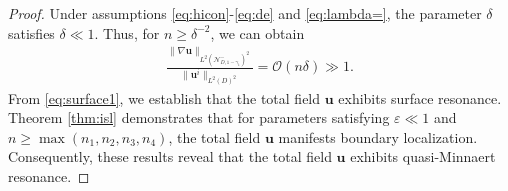 \documentclass[11pt,reqno,twoside]{amsart}
\theoremstyle{definition}
\theoremstyle{remark}
\numberwithin{equation}{section}
\newcommand{\bu}{\mathbf{u}}
\begin{document}
\begin{proof}
			Under assumptions \eqref{eq:hicon}-\eqref{eq:de} and \eqref{eq:lambda=}, the  parameter $\delta$ satisfies $\delta\ll1$. Thus, for $n \geq\delta^{-2}$, we can obtain
			\begin{align}\label{eq:surface1} 
				\frac{\|\nabla\mathbf{u}\|_{L^2(\mathcal{N}_{D,1-\gamma_{1}}^{-})^2}}{\|{\bu}^i\|_{L^2(D)^2}}=\mathcal{O}\left(n\delta\right)\gg1.  
			\end{align}  
			From \eqref{eq:surface1}, we establish that the total field $\mathbf{u}$ exhibits surface resonance.  Theorem \ref{thm:isl} demonstrates that for parameters satisfying $\varepsilon \ll 1$ and $n \geq \max\left(n_1, n_2, n_3, n_4\right)$, the total field $\mathbf{u}$ manifests boundary localization. Consequently, these results reveal that the total field $\mathbf{u}$ exhibits quasi-Minnaert resonance.
			

\end{proof}
\end{document}
